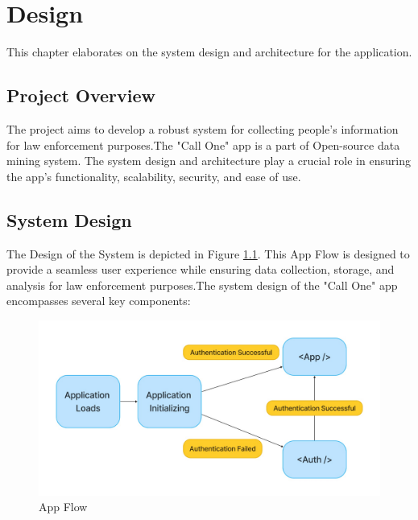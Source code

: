 \chapter{Design}
\justify

This chapter elaborates on the system design and architecture for the {\myprojectname} application.

\section{Project Overview}

The {\myprojectname} project aims to develop a robust system for collecting people's information for law enforcement purposes.The "Call One" app is a part of Open-source data mining system. The system design and architecture play a crucial role in ensuring the app's functionality, scalability, security, and ease of use.

\section{System Design}

The Design of the System is depicted in Figure \ref{fig:App Flow}. This App Flow is designed to provide a seamless user experience while ensuring data collection, storage, and analysis for law enforcement purposes.The system design of the "Call One" app encompasses several key components:

\begin{figure}
    \centering
    \includegraphics[width=1\linewidth]{Media//Application_Flow.jpeg}
    \caption{App Flow}
    \label{fig:App Flow}
\end{figure}


